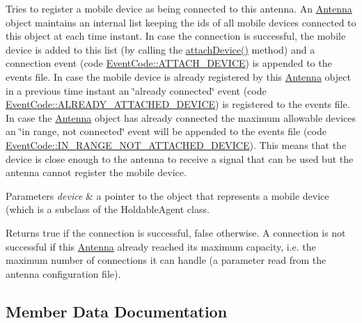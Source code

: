 Tries to register a mobile device as being connected to this antenna. An \hyperlink{class_antenna}{Antenna} object maintains an internal list keeping the ids of all mobile devices connected to this object at each time instant. In case the connection is successful, the mobile device is added to this list (by calling the \hyperlink{class_antenna_a9c804d991a545157feb066761b6a69ef}{attach\+Device()} method) and a connection event (code \hyperlink{_event_code_8h_a080ee5c80bcb8b9f3fda41b5e4eb0ef8a9893a3a649e7100d87b1560bd8202ec2}{Event\+Code\+::\+A\+T\+T\+A\+C\+H\+\_\+\+D\+E\+V\+I\+CE}) is appended to the events file. In case the mobile device is already registered by this \hyperlink{class_antenna}{Antenna} object in a previous time instant an \char`\"{}already connected\char`\"{} event (code \hyperlink{_event_code_8h_a080ee5c80bcb8b9f3fda41b5e4eb0ef8aea76d50440d9cdc0ad1cac6ab9ac4f27}{Event\+Code\+::\+A\+L\+R\+E\+A\+D\+Y\+\_\+\+A\+T\+T\+A\+C\+H\+E\+D\+\_\+\+D\+E\+V\+I\+CE}) is registered to the events file. In case the \hyperlink{class_antenna}{Antenna} object has already connected the maximum allowable devices an \char`\"{}in range, not connected\char`\"{} event will be appended to the events file (code \hyperlink{_event_code_8h_a080ee5c80bcb8b9f3fda41b5e4eb0ef8a6ac0995df1d7ce888368dccf7af3e737}{Event\+Code\+::\+I\+N\+\_\+\+R\+A\+N\+G\+E\+\_\+\+N\+O\+T\+\_\+\+A\+T\+T\+A\+C\+H\+E\+D\+\_\+\+D\+E\+V\+I\+CE}). This means that the device is close enough to the antenna to receive a signal that can be used but the antenna cannot register the mobile device. 
\begin{DoxyParams}{Parameters}
{\em device} & a pointer to the object that represents a mobile device (which is a subclass of the Holdable\+Agent class. \\
\hline
\end{DoxyParams}
\begin{DoxyReturn}{Returns}
true if the connection is successful, false otherwise. A connection is not successful if this \hyperlink{class_antenna}{Antenna} already reached its maximum capacity, i.\+e. the maximum number of connections it can handle (a parameter read from the antenna configuration file). 
\end{DoxyReturn}


\subsection{Member Data Documentation}
\mbox{\label{class_antenna_a77a68a26f1e7844c358960da0e432c79}} 
